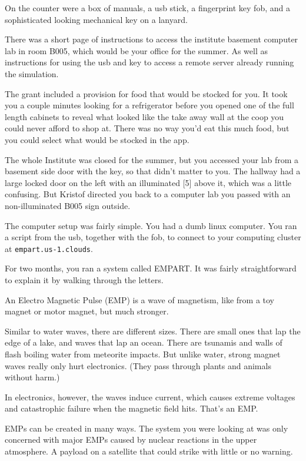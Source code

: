 \documentclass[17pt, twoside, a5paper, openright, extrafontsizes]{memoir}
\begin{document}
On the counter were a box of manuals, a usb stick, a fingerprint key
fob, and a sophisticated looking mechanical key on a lanyard.

There was a short page of instructions to access the institute basement
computer lab in room B005, which would be your office for the summer. As
well as instructions for using the usb and key to access a remote server
already running the simulation.

The grant included a provision for food that would be stocked for you.
It took you a couple minutes looking for a refrigerator before you
opened one of the full length cabinets to reveal what looked like the
take away wall at the coop you could never afford to shop at. There was
no way you'd eat this much food, but you could select what would be
stocked in the app.

The whole Institute was closed for the summer, but you accessed your lab
from a basement side door with the key, so that didn't matter to you.
The hallway had a large locked door on the left with an illuminated
{[}5{]} above it, which was a little confusing. But Kristof directed you
back to a computer lab you passed with an non-illuminated B005 sign
outside.

The computer setup was fairly simple. You had a dumb linux computer. You
ran a script from the usb, together with the fob, to connect to your
computing cluster at \texttt{empart.us-1.clouds}.

For two months, you ran a system called EMPART. It was fairly
straightforward to explain it by walking through the letters.

An Electro Magnetic Pulse (EMP) is a wave of magnetism, like from a toy
magnet or motor magnet, but much stronger.

Similar to water waves, there are different sizes. There are small ones
that lap the edge of a lake, and waves that lap an ocean. There are
tsunamis and walls of flash boiling water from meteorite impacts. But
unlike water, strong magnet waves really only hurt electronics. (They
pass through plants and animals without harm.)

In electronics, however, the waves induce current, which causes extreme
voltages and catastrophic failure when the magnetic field hits. That's
an EMP.

EMPs can be created in many ways. The system you were looking at was
only concerned with major EMPs caused by nuclear reactions in the upper
atmosphere. A payload on a satellite that could strike with little or no
warning.
\end{document}
